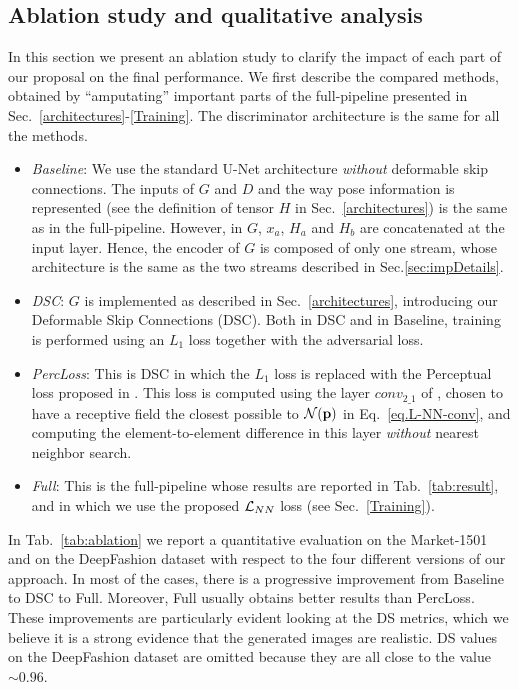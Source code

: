 \documentclass[10pt,twocolumn,letterpaper]{article}
\begin{document}
\subsection{Ablation study and qualitative analysis}
\label{Ablation}
In this section we present  an ablation study to clarify the impact of each part of our proposal on the final performance. We first describe the compared methods, obtained by ``amputating'' important parts of the full-pipeline presented in Sec.~\ref{architectures}-\ref{Training}. The discriminator architecture is the same for all the methods. 

\begin{itemize}
\item \emph{Baseline}:  We use the standard U-Net architecture  \cite{pix2pix2016} {\em without} deformable skip connections. The inputs of $G$ and $D$ and the way pose information is represented (see the definition of tensor $H$ in Sec.~\ref{architectures}) is the same as in 
the full-pipeline. However, in $G$, $x_a$, $H_a$ and $H_b$ are
 concatenated at the input layer. Hence,
 the encoder of $G$ is  composed of only one stream, whose architecture is the same as the two streams  described in Sec.\ref{sec:impDetails}. 

\item \emph{DSC}: $G$ is implemented as described in Sec.~\ref{architectures}, introducing our Deformable Skip Connections (DSC). Both in DSC and in Baseline, training is performed using an $L_1$ loss together with the adversarial loss.

\item
\emph{PercLoss}: This is DSC in which the $L_1$ loss is replaced with the Perceptual loss proposed in \cite{DBLP:conf/eccv/JohnsonAF16}. 
This loss is computed using the layer $conv_{2\_1}$ of \cite{DBLP:journals/corr/SimonyanZ14a}, chosen to have a receptive field the closest possible to ${\cal N}( \mathbf{p})$ in Eq.~\ref{eq.L-NN-conv}, and computing the element-to-element difference in this layer  {\em without} nearest neighbor search. 



\item \emph{Full}: This is the full-pipeline whose results are reported in Tab.~\ref{tab:result}, and in which we use the proposed ${\cal L}_{NN}$ loss (see Sec.~\ref{Training}).
\end{itemize}

In Tab.~\ref{tab:ablation} we report a quantitative evaluation on the Market-1501 and on the DeepFashion dataset with respect to the four different versions of our approach. 
In most of the cases, there is a   progressive improvement  from  Baseline to  DSC to Full. Moreover, Full usually obtains better results than 
PercLoss. These improvements are particularly evident looking at the DS metrics, which we believe it is a strong evidence that the generated images are realistic.  
 DS values on the DeepFashion dataset are omitted because they are all close to the value $\sim0.96$. 
\end{document}
